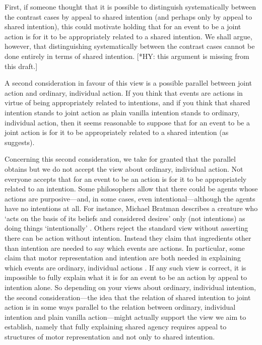 \documentclass[12pt,\papersize]{extarticle}
\begin{document}
First, if someone thought that it is possible to distinguish systematically between the contrast cases by appeal to shared intention (and perhaps only by appeal to shared intention), this could motivate holding that for an event to be a joint action is for it to be appropriately related to a shared intention.
We shall argue, however, that distinguishing systematically between the contrast cases cannot be done entirely in terms of shared intention.
[*HY: this argument is missing from this draft.]

{\label{text:second_consideration} A second consideration} in favour of this view is a possible parallel between joint action and ordinary, individual action.
If you think that events are actions in virtue of being appropriately related to intentions, 
and if you think that shared intention stands to joint action as plain vanilla intention stands to ordinary, individual action,
then it seems reasonable to suppose that for an event to be a joint action is for it to be appropriately related to a shared intention (as \citealp{Pacherie:2012fk} suggests).

Concerning this second consideration, 
we take for granted that the parallel obtains but we do not accept the view about ordinary, individual action.
Not everyone accepts that for an event to be an action is for it to be appropriately related to an intention.
Some philosophers allow that there could be agents whose actions are purposive---and, in some cases, even intentional---although  the agents have no intentions at all.
For instance, Michael Bratman describes a creature who `acts on the basis of its beliefs and considered desires' only (not intentions) as doing things `intentionally' \citet[p.\ 251]{bratman:2000_valuing}.%
Others reject the standard view without asserting there can be action without intention.
Instead they claim that ingredients other than intention are needed to say which events are actions.
In particular, some claim that motor representation and intention are both needed in explaining which events are ordinary, individual actions \citep{pacherie:2000_content,butterfill:2012_intention}.
If any such view is correct, it is impossible to fully explain what it is for an event to be an action by appeal to intention alone.
So depending on your views about ordinary, individual intention,
the second consideration---the idea that the relation of shared intention to joint action is in some ways parallel to the relation between ordinary, individual intention and plain vanilla action---might actually support the view we aim to establish, namely that fully explaining shared agency requires appeal to structures of motor representation and not only to shared intention.
\end{document}
